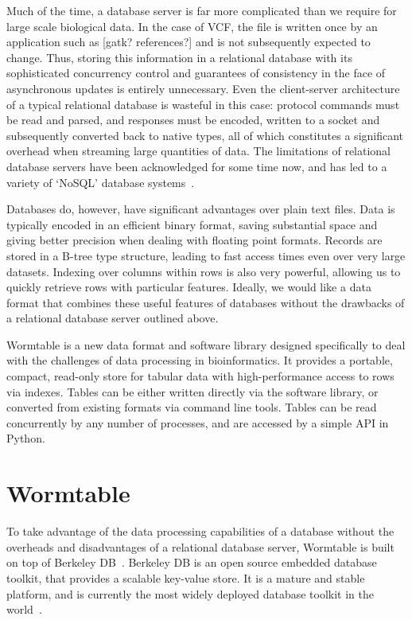 \documentclass{bioinfo}
\begin{document}
Much of the time, a database server is far more complicated than
we require for large scale biological data. In the case of VCF,
the file is written once by an application such as [gatk? references?]
and is not subsequently expected to change. Thus, storing this information 
in a relational database with its sophisticated concurrency control
and guarantees of consistency in the face of asynchronous updates
is entirely unnecessary. Even the client-server architecture of 
a typical relational database is wasteful in this case: protocol 
commands must be read and parsed, and responses must be encoded,
written to a socket and subsequently converted back to native types,
all of which constitutes a significant overhead when streaming large 
quantities of data. The limitations of relational database servers 
have been acknowledged for some time now, and has led to a 
variety of `NoSQL' database systems~\citep{m12}.

Databases do, however, have significant advantages over 
plain text files. Data is typically encoded in an efficient binary 
format, saving substantial space and giving better precision when 
dealing with floating point formats. Records are stored in a
B-tree type structure, leading to fast access times even 
over very large datasets. Indexing over columns within rows is 
also very powerful, allowing us to quickly retrieve 
rows with particular features. Ideally, we would like a data format
that combines these useful features of databases without the 
drawbacks of a relational database server outlined above.

Wormtable 
is a new data format and software library designed specifically
to deal with the challenges of data processing in bioinformatics.
It provides a portable, compact, read-only store for tabular
data with high-performance access to rows via indexes. Tables can
be either written directly via the software library, or converted
from existing formats via command line tools. Tables can be read 
concurrently by any number of processes, and are accessed by a 
simple API in Python.


\section{Wormtable}
To take advantage of the data processing capabilities of a database
without the overheads and disadvantages of a relational database 
server, Wormtable is built on top of Berkeley DB~\citep{obs99}.
Berkeley DB is an open source embedded database toolkit, that provides a
scalable key-value store. It is a mature and stable platform, 
and is currently the most widely deployed database toolkit in the 
world~\citep{sb12}.
\end{document}
